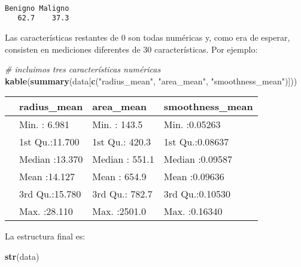 \documentclass[
]{article}
\newenvironment{Shaded}{\begin{snugshade}}{\end{snugshade}}
\newcommand{\CommentTok}[1]{\textcolor[rgb]{0.56,0.35,0.01}{\textit{#1}}}
\newcommand{\KeywordTok}[1]{\textcolor[rgb]{0.13,0.29,0.53}{\textbf{#1}}}
\newcommand{\NormalTok}[1]{#1}
\newcommand{\StringTok}[1]{\textcolor[rgb]{0.31,0.60,0.02}{#1}}
\begin{document}
\begin{verbatim}

Benigno Maligno 
   62.7    37.3 
\end{verbatim}

Las características restantes de 0 son todas numéricas y, como era de
esperar, consisten en mediciones diferentes de 30 características. Por
ejemplo:

\begin{Shaded}
\begin{Highlighting}[]
\CommentTok{# incluimos tres características numéricas}
\KeywordTok{kable}\NormalTok{(}\KeywordTok{summary}\NormalTok{(data[}\KeywordTok{c}\NormalTok{(}\StringTok{"radius_mean"}\NormalTok{, }\StringTok{"area_mean"}\NormalTok{, }\StringTok{"smoothness_mean"}\NormalTok{)]))}
\end{Highlighting}
\end{Shaded}

\begin{tabular}{l|l|l|l}
\hline
  &  radius\_mean &   area\_mean & smoothness\_mean\\
\hline
 & Min.   : 6.981 & Min.   : 143.5 & Min.   :0.05263\\
\hline
 & 1st Qu.:11.700 & 1st Qu.: 420.3 & 1st Qu.:0.08637\\
\hline
 & Median :13.370 & Median : 551.1 & Median :0.09587\\
\hline
 & Mean   :14.127 & Mean   : 654.9 & Mean   :0.09636\\
\hline
 & 3rd Qu.:15.780 & 3rd Qu.: 782.7 & 3rd Qu.:0.10530\\
\hline
 & Max.   :28.110 & Max.   :2501.0 & Max.   :0.16340\\
\hline
\end{tabular}

La estructura final es:

\begin{Shaded}
\begin{Highlighting}[]
\KeywordTok{str}\NormalTok{(data)}
\end{Highlighting}
\end{Shaded}
\end{document}

